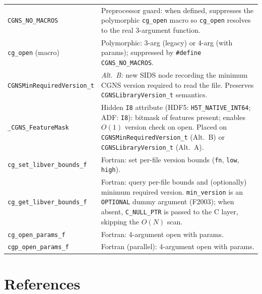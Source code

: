 \documentclass[11pt,letterpaper]{article}
\begin{document}
\begin{center}
\begin{longtable}{l p{8.5cm}}
\texttt{CGNS\_NO\_MACROS}      & Preprocessor guard: when defined, suppresses the polymorphic \texttt{cg\_open} macro so \texttt{cg\_open} resolves to the real 3-argument function. \\
\texttt{cg\_open} (macro)       & Polymorphic: 3-arg (legacy) or 4-arg (with params); suppressed by \texttt{\#define CGNS\_NO\_MACROS}. \\
\texttt{CGNSMinRequiredVersion\_t} & \emph{Alt.~B:} new SIDS node recording the minimum CGNS version required to read the file.  Preserves \texttt{CGNSLibraryVersion\_t} semantics. \\
\texttt{\_CGNS\_FeatureMask}   & Hidden \texttt{I8} attribute (HDF5: \texttt{H5T\_NATIVE\_INT64}; ADF: \texttt{I8}): bitmask of features present; enables $O(1)$ version check on open. Placed on \texttt{CGNSMinRequiredVersion\_t} (Alt.~B) or \texttt{CGNSLibraryVersion\_t} (Alt.~A). \\
\texttt{cg\_set\_libver\_bounds\_f} & Fortran: set per-file version bounds (\texttt{fn}, \texttt{low}, \texttt{high}). \\
\texttt{cg\_get\_libver\_bounds\_f} & Fortran: query per-file bounds and (optionally) minimum required version.  \texttt{min\_version} is an \texttt{OPTIONAL} dummy argument (F2003); when absent, \texttt{C\_NULL\_PTR} is passed to the C layer, skipping the $O(N)$ scan. \\
\texttt{cg\_open\_params\_f}    & Fortran: 4-argument open with params. \\
\texttt{cgp\_open\_params\_f}   & Fortran (parallel): 4-argument open with params. \\
\bottomrule
\end{longtable}
\end{center}

\section{References}
\end{document}

